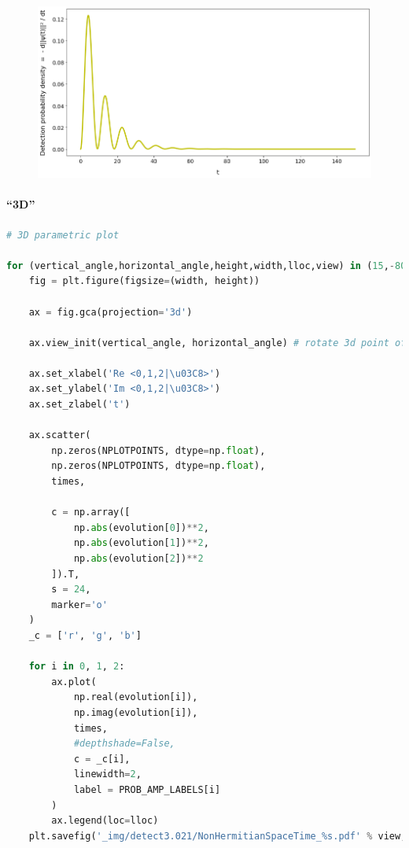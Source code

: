 \begin{figure}[h!]
\centering
\includegraphics[width=0.66\linewidth]{tex/appendix/nb/jupyter/3lev/output_46_0.png}

\end{figure}

\hypertarget{d}{%
\paragraph{``3D''}\label{d}}

\begin{lstlisting}[language=Python]
# 3D parametric plot

for (vertical_angle,horizontal_angle,height,width,lloc,view) in (15,-80,15,15,'center left','side'), (90, -80, 15, 15,'center left','top'):
    fig = plt.figure(figsize=(width, height))

    ax = fig.gca(projection='3d')

    ax.view_init(vertical_angle, horizontal_angle) # rotate 3d point of view

    ax.set_xlabel('Re <0,1,2|\u03C8>')
    ax.set_ylabel('Im <0,1,2|\u03C8>')
    ax.set_zlabel('t')

    ax.scatter(
        np.zeros(NPLOTPOINTS, dtype=np.float),
        np.zeros(NPLOTPOINTS, dtype=np.float),
        times,

        c = np.array([
            np.abs(evolution[0])**2,
            np.abs(evolution[1])**2,
            np.abs(evolution[2])**2
        ]).T,
        s = 24,
        marker='o'
    )
    _c = ['r', 'g', 'b']

    for i in 0, 1, 2:
        ax.plot(
            np.real(evolution[i]),
            np.imag(evolution[i]),
            times,
            #depthshade=False,
            c = _c[i],
            linewidth=2,
            label = PROB_AMP_LABELS[i]
        )
        ax.legend(loc=lloc)
    plt.savefig('_img/detect3.021/NonHermitianSpaceTime_%s.pdf' % view, bbox_inches='tight', pad_inches=0)
\end{lstlisting}

